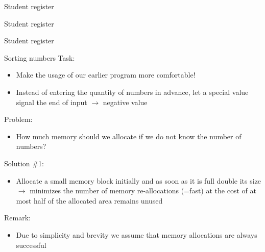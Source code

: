 \documentclass[usenames,dvipsnames,aspectratio=169]{beamer}
\begin{document}
\begin{frame}{Student register}
  \begin{exampleblock}{}
    
  \end{exampleblock}
\end{frame}

\begin{frame}{Student register}
  \footnotesize
  \begin{exampleblock}{}
    
  \end{exampleblock}
\end{frame}

\begin{frame}{Student register}
  \begin{exampleblock}{}
    
  \end{exampleblock}
\end{frame}

\begin{frame}{Sorting numbers}
  \small
  Task:
  \begin{itemize}
    \item Make the usage of our earlier program more comfortable! 
    \item Instead of entering the quantity of numbers in advance, let a special value signal the end of input $\to$ negative value
  \end{itemize}
  Problem:
  \begin{itemize}
    \item[] How much memory should we allocate if we do not know the number of numbers?
  \end{itemize}
  Solution \#1:
  \begin{itemize}
    \item[] Allocate a small memory block initially and as soon as it is full double its size $\to$ minimizes the number of memory re-allocations (=fast) at the cost of at most half of the allocated area remains unused
  \end{itemize}
  Remark:
  \begin{itemize}
    \item[] Due to simplicity and brevity we assume that memory allocations are always successful
  \end{itemize}
\end{frame}
\end{document}
